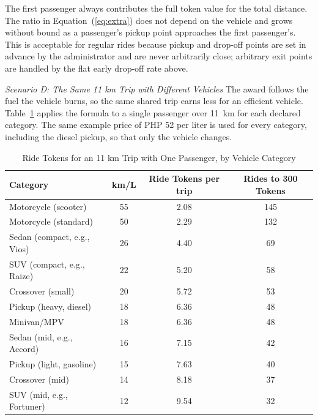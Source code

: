 \vspace{1em}
The first passenger always contributes the full token value for the total distance. The ratio in Equation~(\ref{eq:extra}) does not depend on the vehicle and grows without bound as a passenger's pickup point approaches the first passenger's. This is acceptable for regular rides because pickup and drop-off points are set in advance by the administrator and are never arbitrarily close; arbitrary exit points are handled by the flat early drop-off rate above.

\vspace{1em}
\noindent\textit{Scenario D: The Same 11 km Trip with Different Vehicles}
The award follows the fuel the vehicle burns, so the same shared trip earns less for an efficient vehicle. Table~\ref{tab:scenario-vehicles} applies the formula to a single passenger over 11~km for each declared category. The same example price of PHP 52 per liter is used for every category, including the diesel pickup, so that only the vehicle changes.

\begin{table}[htbp]
    \centering
    \caption{Ride Tokens for an 11 km Trip with One Passenger, by Vehicle Category}
    \label{tab:scenario-vehicles}
    \small
    \renewcommand{\arraystretch}{1.2}
    \begin{tabular}{|l|c|c|c|}
        \hline
        \textbf{Category} & \textbf{km/L} & \textbf{Ride Tokens per trip} & \textbf{Rides to 300 Tokens} \\
        \hline
        Motorcycle (scooter) & 55 & 2.08 & 145 \\
        Motorcycle (standard) & 50 & 2.29 & 132 \\
        Sedan (compact, e.g., Vios) & 26 & 4.40 & 69 \\
        SUV (compact, e.g., Raize) & 22 & 5.20 & 58 \\
        Crossover (small) & 20 & 5.72 & 53 \\
        Pickup (heavy, diesel) & 18 & 6.36 & 48 \\
        Minivan/MPV & 18 & 6.36 & 48 \\
        Sedan (mid, e.g., Accord) & 16 & 7.15 & 42 \\
        Pickup (light, gasoline) & 15 & 7.63 & 40 \\
        Crossover (mid) & 14 & 8.18 & 37 \\
        SUV (mid, e.g., Fortuner) & 12 & 9.54 & 32 \\
        \hline
    \end{tabular}
\end{table}


